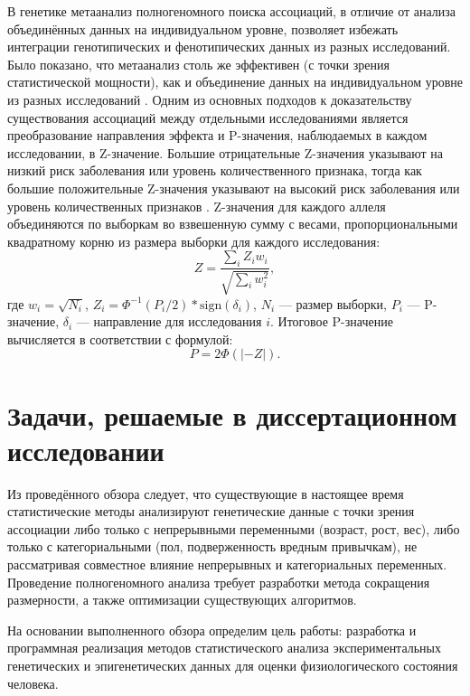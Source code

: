 В генетике метаанализ полногеномного поиска ассоциаций, в отличие от анализа объединённых данных на индивидуальном уровне, позволяет избежать интеграции генотипических и фенотипических данных из разных исследований. Было показано, что метаанализ столь же эффективен (с точки зрения статистической мощности), как и объединение данных на индивидуальном уровне из разных исследований \autocite{Lin2009}. Одним из основных подходов к доказательству существования ассоциаций между отдельными исследованиями является преобразование направления эффекта и P-значения, наблюдаемых в каждом исследовании, в Z-значение. Большие отрицательные Z-значения указывают на низкий риск заболевания или уровень количественного признака, тогда как большие положительные Z-значения указывают на высокий риск заболевания или уровень количественных признаков \autocite{Willer2010}. Z-значения для каждого аллеля объединяются по выборкам во взвешенную сумму с весами, пропорциональными квадратному корню из размера выборки для каждого исследования:
\begin{equation}
\label{eq:metal_z}
Z=\frac{\sum_{i}Z_i w_i}{\sqrt{\sum_{i}w_i^2}},
\end{equation}
где $w_i = \sqrt{N_i}$, $Z_i = \Phi^{-1}\left(P_i/2\right) * \text{sign}(\delta_i)$, $N_i$ --- размер выборки, $P_i$ --- P-значение, $\delta_i$ --- направление для исследования $i$. Итоговое P-значение вычисляется в соответствии с формулой:
\begin{equation}
\label{eq:metal_p}
P = 2\Phi \left(|-Z|\right).
\end{equation}

\section{Задачи, решаемые в диссертационном исследовании}\label{sec:ch1/sec3}

Из проведённого обзора следует, что существующие в настоящее время статистические методы анализируют генетические данные с точки зрения ассоциации либо только с непрерывными переменными (возраст, рост, вес), либо только с категориальными (пол, подверженность вредным привычкам), не рассматривая совместное влияние непрерывных и категориальных переменных. Проведение полногеномного анализа требует разработки метода сокращения размерности, а также оптимизации существующих алгоритмов.

На основании выполненного обзора определим цель работы: разработка и программная реализация методов статистического анализа экспериментальных генетических и эпигенетических данных для оценки физиологического состояния человека.

